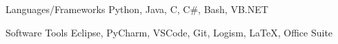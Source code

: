 
\begin{cvskills}
  \cvskill
    {Languages/Frameworks} %
    {Python, Java, C, C\#, Bash, VB.NET} %

  \cvskill
    {Software Tools} %
    {Eclipse, PyCharm, VSCode, Git, Logism, LaTeX, Office Suite} %
\end{cvskills}
